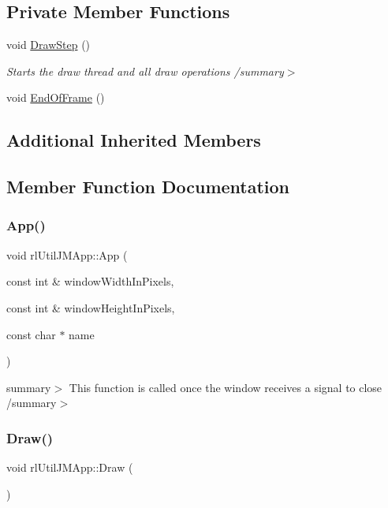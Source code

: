 \subsection*{Private Member Functions}
\begin{DoxyCompactItemize}
\item 
void \hyperlink{classrl_util_j_m_app_ab85c6b31f7ff7d7825f13b0ebe49261d}{Draw\+Step} ()
\begin{DoxyCompactList}\small\item\em Starts the draw thread and all draw operations /summary$>$ \end{DoxyCompactList}\item 
void \hyperlink{classrl_util_j_m_app_ad2333da858d397b08fd99fea22ad2c9d}{End\+Of\+Frame} ()
\end{DoxyCompactItemize}
\subsection*{Additional Inherited Members}


\subsection{Member Function Documentation}
\mbox{\label{classrl_util_j_m_app_a322eb5957d1fea6fe19423085ed9fb33}} 
\subsubsection{\texorpdfstring{App()}{App()}}
{\footnotesize\ttfamily void rl\+Util\+J\+M\+App\+::\+App (\begin{DoxyParamCaption}\item[{const int \&}]{window\+Width\+In\+Pixels,  }\item[{const int \&}]{window\+Height\+In\+Pixels,  }\item[{const char $\ast$}]{name }\end{DoxyParamCaption})}

summary$>$ This function is called once the window receives a signal to close /summary$>$ \mbox{\label{classrl_util_j_m_app_ae8abc1581be03bd0dd50ec4fcd915062}} 
\subsubsection{\texorpdfstring{Draw()}{Draw()}}
{\footnotesize\ttfamily void rl\+Util\+J\+M\+App\+::\+Draw (\begin{DoxyParamCaption}{ }\end{DoxyParamCaption})\hspace{0.3cm}{\ttfamily [virtual]}}



